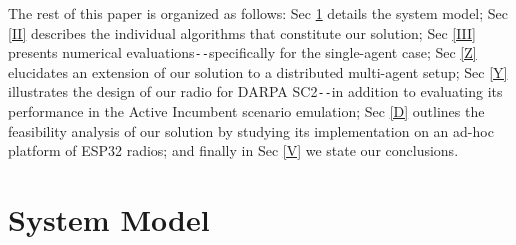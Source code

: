 \documentclass[12pt, draftcls, onecolumn]{IEEEtran}
\begin{document}
The rest of this paper is organized as follows: Sec \ref{I} details the system model; Sec \ref{II} describes the individual algorithms that constitute our solution; Sec \ref{III} presents numerical evaluations\texttt{-{}-}specifically for the single-agent case; Sec \ref{Z} elucidates an extension of our solution to a distributed multi-agent setup; Sec \ref{Y} illustrates the design of our radio for DARPA SC2\texttt{-{}-}in addition to evaluating its performance in the Active Incumbent scenario emulation; Sec \ref{D} outlines the feasibility analysis of our solution by studying its implementation on an ad-hoc platform of ESP32 radios; and finally in Sec \ref{V} we state our conclusions.

\section{System Model}\label{I}
\end{document}
